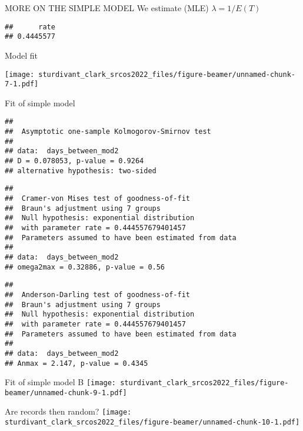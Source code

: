 \documentclass[
  ignorenonframetext,
]{beamer}
\begin{document}
\begin{frame}[fragile]{MORE ON THE SIMPLE MODEL}
\protect\hypertarget{more-on-the-simple-model}{}
We estimate (MLE) \(\lambda = 1/E(T)\)

\begin{verbatim}
##      rate 
## 0.4445577
\end{verbatim}

Model fit

\texttt{[image: sturdivant\_clark\_srcos2022\_files/figure-beamer/unnamed-chunk-7-1.pdf]}
\end{frame}

\begin{frame}[fragile]{Fit of simple model}
\protect\hypertarget{fit-of-simple-model}{}
\begin{verbatim}
## 
##  Asymptotic one-sample Kolmogorov-Smirnov test
## 
## data:  days_between_mod2
## D = 0.078053, p-value = 0.9264
## alternative hypothesis: two-sided
\end{verbatim}

\begin{verbatim}
## 
##  Cramer-von Mises test of goodness-of-fit
##  Braun's adjustment using 7 groups
##  Null hypothesis: exponential distribution
##  with parameter rate = 0.444557679401457
##  Parameters assumed to have been estimated from data
## 
## data:  days_between_mod2
## omega2max = 0.32886, p-value = 0.56
\end{verbatim}

\begin{verbatim}
## 
##  Anderson-Darling test of goodness-of-fit
##  Braun's adjustment using 7 groups
##  Null hypothesis: exponential distribution
##  with parameter rate = 0.444557679401457
##  Parameters assumed to have been estimated from data
## 
## data:  days_between_mod2
## Anmax = 2.147, p-value = 0.4345
\end{verbatim}
\end{frame}

\begin{frame}{Fit of simple model B}
\protect\hypertarget{fit-of-simple-model-b}{}
\texttt{[image: sturdivant\_clark\_srcos2022\_files/figure-beamer/unnamed-chunk-9-1.pdf]}
\end{frame}

\begin{frame}{Are records then random?}
\protect\hypertarget{are-records-then-random}{}
\texttt{[image: sturdivant\_clark\_srcos2022\_files/figure-beamer/unnamed-chunk-10-1.pdf]}
\end{frame}
\end{document}
